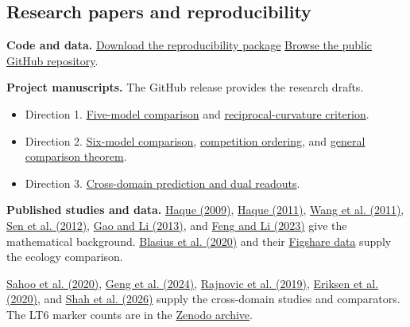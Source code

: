\newcommand{\repo}{https://github.com/lijincheng494gmail/project-3h-research-extensions}
\newcommand{\asset}[2]{\href{\repo/releases/download/v1.0/#1}{#2}}
\newcommand{\sourceLink}[2]{\href{https://doi.org/#1}{#2}}

\subsection*{Research papers and reproducibility}
\textbf{Code and data.}
\asset{Project_3H_Research_Extensions_Source.zip}{Download the reproducibility package}
\quad
\href{\repo}{Browse the public GitHub repository}.

\textbf{Project manuscripts.}
The GitHub release provides the research drafts.
\begin{itemize}[leftmargin=1.2em,topsep=2pt,itemsep=1pt]
\item Direction 1.
\asset{Direction_1_Five_Model_Comparison.pdf}{Five-model comparison}
and \asset{Direction_1_Enrichment_Criterion.pdf}{reciprocal-curvature criterion}.
\item Direction 2.
\asset{Direction_2_Six_Model_Comparison.pdf}{Six-model comparison},
\asset{Direction_2_Competition_Ordering.pdf}{competition ordering},
and \asset{Direction_2_General_Comparison.pdf}{general comparison theorem}.
\item Direction 3.
\asset{Direction_3_Cross_Domain_Prediction.pdf}{Cross-domain prediction and dual readouts}.
\end{itemize}

\textbf{Published studies and data.}
\sourceLink{10.1007/s11538-008-9368-4}{Haque (2009)},
\sourceLink{10.1016/j.mbs.2011.07.003}{Haque (2011)},
\sourceLink{10.1007/s00285-010-0332-1}{Wang et al. (2011)},
\sourceLink{10.1016/j.ecocom.2012.01.002}{Sen et al. (2012)},
\sourceLink{10.3934/dcdsb.2013.18.2283}{Gao and Li (2013)}, and
\sourceLink{10.58997/ejde.2023.17}{Feng and Li (2023)}
give the mathematical background.
\sourceLink{10.1038/s41586-019-1857-0}{Blasius et al. (2020)}
and their \sourceLink{10.6084/m9.figshare.10045976.v1}{Figshare data}
supply the ecology comparison.

\sourceLink{10.1098/rsif.2019.0734}{Sahoo et al. (2020)},
\sourceLink{10.1038/s41467-024-51913-6}{Geng et al. (2024)},
\sourceLink{10.1371/journal.pone.0216292}{Rajnovic et al. (2019)},
\sourceLink{10.1038/s41598-020-59635-7}{Eriksen et al. (2020)}, and
\sourceLink{10.1186/s12935-026-04419-8}{Shah et al. (2026)}
supply the cross-domain studies and comparators.
The LT6 marker counts are in the \sourceLink{10.5281/zenodo.12823159}{Zenodo archive}.
